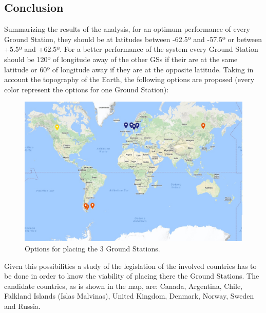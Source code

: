 \subsection{Conclusion}
Summarizing the results of the analysis, for an optimum performance of every Ground Station, they should be at latitudes between -62.5º and -57.5º or between +5.5º and +62.5º. For a better performance of the system every Ground Station should be 120º of longitude away of the other GSs if their are at the same latitude or 60º of longitude away if they are at the opposite latitude. Taking in account the topography of the Earth, the following options are proposed (every color represent the options for one Ground Station):

\begin{figure}[H]
\begin{center}
\includegraphics[scale=0.65]{Options.jpg}
\caption{Options for placing the 3 Ground Stations.}
\end{center}
\end{figure}
Given this possibilities a study of the legislation of the involved countries has to be done in order to know the viability of placing there the Ground Stations. The candidate countries, as is shown in the map, are: Canada, Argentina, Chile, Falkland Islands (Islas Malvinas), United Kingdom, Denmark, Norway, Sweden and Russia. 
